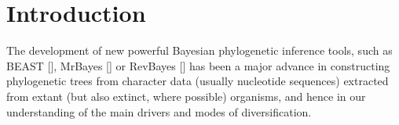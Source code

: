 \section{Introduction}

The development of new powerful Bayesian phylogenetic inference tools, 
such as BEAST [\cite{drummond2007beast}], 
MrBayes [\cite{huelsenbeck2001mrbayes}]
or RevBayes [\cite{hohna2016revbayes}] 
has been a major advance in constructing phylogenetic trees 
from character data (usually nucleotide sequences) extracted 
from extant (but also extinct, where possible) organisms, and hence in our understanding of the main drivers 
and modes of diversification.

